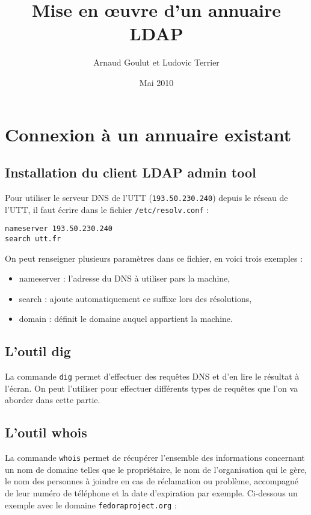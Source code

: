 \documentclass[12pt,a4paper,notitlepage]{article}
\begin{document}
\title{Mise en \oe uvre d'un annuaire LDAP}
\author{Arnaud Goulut et Ludovic Terrier}
\date{Mai 2010}
\maketitle



\thispagestyle{empty}




\section{Connexion à un annuaire existant}

\subsection{Installation du client LDAP admin tool}
Pour utiliser le serveur DNS de l'UTT (\texttt{193.50.230.240}) depuis le réseau de l'UTT, il faut écrire dans le fichier \texttt{/etc/resolv.conf} : \\

\begin{lstlisting}[title=Contenu du fichier resolv.conf]
nameserver 193.50.230.240
search utt.fr
\end{lstlisting}

\bigskip
On peut renseigner plusieurs paramètres dans ce fichier, en voici trois exemples :
\begin{itemize}
\item nameserver : l'adresse du DNS à utiliser pars la machine,
\item search : ajoute automatiquement ce suffixe lors des résolutions,
\item domain : définit le domaine auquel appartient la machine.
\end{itemize}


\subsection{L'outil dig}
La commande \texttt{dig} permet d'effectuer des requêtes DNS et d'en lire le résultat à l'écran. On peut l'utiliser pour effectuer différents types de requêtes que l'on va aborder dans cette partie.



\clearpage
\subsection{L'outil whois}
La commande \texttt{whois} permet de récupérer l'ensemble des informations concernant un nom de domaine telles que le propriétaire, le nom de l'organisation qui le gère, le nom des personnes à joindre en cas de réclamation ou problème, accompagné de leur numéro de téléphone et la date d'expiration par exemple.
Ci-dessous un exemple avec le domaine \texttt{fedoraproject.org} :\\
\end{document}
